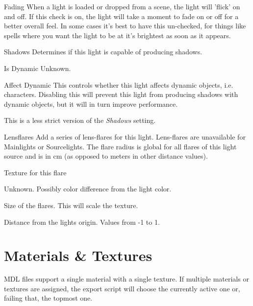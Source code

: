 \begin{propertyAurora}{Fading}
When a light is loaded or dropped from a scene, the light will 'flick' on and off. 
If this check is on, the light will take a moment to fade on or off for a better overall feel.
In some cases it’s best to have this un-checked, for things like spells where you want 
the light to be at it’s brightest as soon as it appears.
\end{propertyAurora}

\begin{propertyAurora}{Shadows}
Determines if this light is capable of producing shadows.
\end{propertyAurora}

\begin{propertyAurora}{Is Dynamic}
Unknown.
\end{propertyAurora}

\begin{propertyAurora}{Affect Dynamic}
This controls whether this light affects dynamic objects, i.e. characters.
Disabling this will prevent this light from producing shadows with dynamic
objects, but it will in turn improve performance.

This is a less strict version of the \textit{Shadows} setting.
\end{propertyAurora}

\begin{propertyAurora}{Lensflares}
Add a series of lens-flares for this light. Lens-flares are unavailable for 
Mainlights or Sourcelights. The flare radius is global for all flares of 
this light source and is in cm (as opposed to meters in other distance values).
\begin{description}[leftmargin=6em,style=nextline]
    \item[Texture] Texture for this flare
    \item[Colorshift] Unknown. Possibly color difference from the light color.
    \item[Size] Size of the flares. This will scale the texture.
    \item[Position] Distance from the lights origin. Values from -1 to 1.
\end{description}
\end{propertyAurora}

\section{Materials \& Textures}
MDL files support a single material with a single texture. If multiple 
materials or textures are assigned, the export script will choose the currently 
active one or, failing that, the topmost one.

